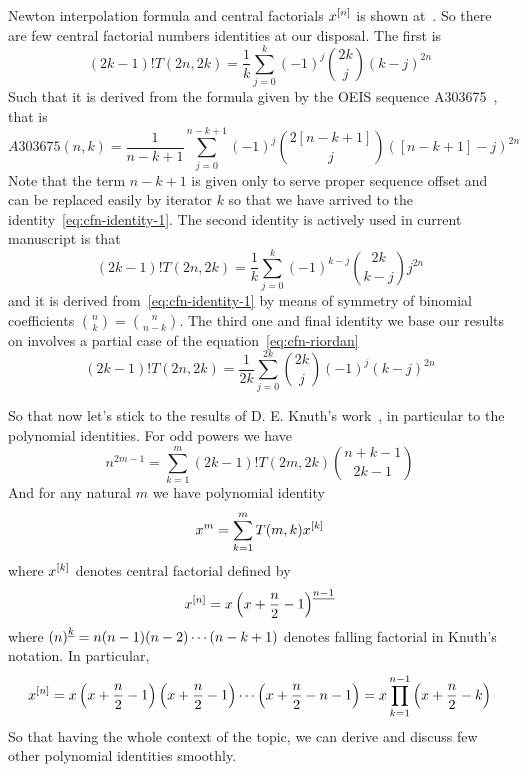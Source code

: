 Newton interpolation formula and central factorials $x^{[n]}$
is shown at~\cite{scheuer2020mathstackexchange}.
So there are few central factorial numbers identities at our disposal.
The first is
\begin{equation}
(2k-1)
    !T(2n,2k) = \frac{1}{k} \sum_{j=0}^{k} (-1)^j \binom{2k}{j} (k-j)^{2n}\label{eq:cfn-identity-1}
\end{equation}
Such that it is derived from the formula given by the OEIS sequence A303675~\cite{kolosov2018coefficients}, that is
\begin{equation*}
    A303675(n,k) = \frac{1}{n-k+1} \sum_{j=0}^{n-k+1} (-1)^{j} \binom{2[n-k+1]}{j} ([n-k+1]-j)^{2n}
\end{equation*}
Note that the term $n-k+1$ is given only to serve proper sequence offset and can be replaced easily by iterator $k$
so that we have arrived to the identity~\eqref{eq:cfn-identity-1}.
The second identity is actively used in current manuscript is that
\begin{equation}
(2k-1)
    !T(2n,2k) = \frac{1}{k} \sum_{j=0}^{k} (-1)^{k-j} \binom{2k}{k-j} j^{2n}\label{eq:cfn-identity-2}
\end{equation}
and it is derived from~\eqref{eq:cfn-identity-1} by means
of symmetry of binomial coefficients $\binom{n}{k} = \binom{n}{n-k}$.
The third one and final identity we base our results on involves a partial case of the equation~\eqref{eq:cfn-riordan}
\begin{equation}
(2k-1)
    !T(2n, 2k) = \frac{1}{2k} \sum_{j=0}^{2k} \binom{2k}{j} (-1)^{j} (k-j)^{2n}\label{eq:cfn-identity-3}
\end{equation}

So that now let's stick to the results of D. E. Knuth's work~\cite{knuth1993johann},
in particular to the polynomial identities.
For odd powers we have
\begin{equation}
    n^{2m-1} = \sum_{k=1}^{m} (2k-1)! T(2m,2k) \binom{n+k-1}{2k-1}\label{eq:knuth-odd-power}
\end{equation}
And for any natural $m$ we have polynomial identity
\begin{equation}
    x^m = \sum_{k=1}^{m} T(m, k) x^{[k]}\label{eq:knuth-power-identity}
\end{equation}
where $x^{[k]}$ denotes central factorial defined by
\begin{equation*}
    x^{[n]} = x \left(x+\frac{n}{2}-1 \right)^{\underline{n-1}}
\end{equation*}
where $\left(n \right)^{\underline{k}} = n (n-1) (n-2) \cdots (n-k+1)$ denotes falling factorial in Knuth's notation.
In particular,
\begin{equation*}
    x^{[n]}
    = x \left( x+\frac{n}{2}-1 \right) \left( x+\frac{n}{2}-1 \right) \cdots \left (x+\frac{n}{2}-n-1 \right)
    = x \prod_{k=1}^{n-1} \left( x+\frac{n}{2}-k \right)
\end{equation*}
So that having the whole context of the topic, we can derive and discuss few other polynomial identities smoothly.

